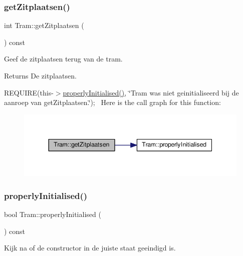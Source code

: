 \subsubsection{\texorpdfstring{get\+Zitplaatsen()}{getZitplaatsen()}}
{\footnotesize\ttfamily int Tram\+::get\+Zitplaatsen (\begin{DoxyParamCaption}{ }\end{DoxyParamCaption}) const}



Geef de zitplaatsen terug van de tram. 

\begin{DoxyReturn}{Returns}
De zitplaatsen.
\end{DoxyReturn}
R\+E\+Q\+U\+I\+RE(this-\/$>$\hyperlink{class_tram_ac2688f590e4db232b4f535c9bf959efb}{properly\+Initialised()}, \char`\"{}\+Tram was niet geinitialiseerd bij de aanroep van get\+Zitplaatsen.\char`\"{});~\newline
Here is the call graph for this function\+:
\nopagebreak
\begin{figure}[H]
\begin{center}
\leavevmode
\includegraphics[width=344pt]{class_tram_abcb1ce0d10e394fce8a99b460e5104de_cgraph}
\end{center}
\end{figure}
\mbox{\label{class_tram_ac2688f590e4db232b4f535c9bf959efb}} 
\subsubsection{\texorpdfstring{properly\+Initialised()}{properlyInitialised()}}
{\footnotesize\ttfamily bool Tram\+::properly\+Initialised (\begin{DoxyParamCaption}{ }\end{DoxyParamCaption}) const}



Kijk na of de constructor in de juiste staat geeindigd is. 

